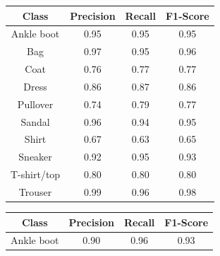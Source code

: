  \begin{table}[H]
    \centering
    \begin{minipage}{0.32\textwidth}
        \centering
        \begin{adjustbox}{max width=1\textwidth}
            \begin{tabular}{|c|c|c|c|}
                \hline
                \textbf{Class}     & \textbf{Precision} & \textbf{Recall} & \textbf{F1-Score} \\ \hline
                Ankle boot         & 0.95               & 0.95            & 0.95              \\
                Bag                & 0.97               & 0.95            & 0.96              \\
                Coat               & 0.76               & 0.77            & 0.77              \\
                Dress              & 0.86               & 0.87            & 0.86              \\
                Pullover           & 0.74               & 0.79            & 0.77              \\
                Sandal             & 0.96               & 0.94            & 0.95              \\
                Shirt              & 0.67               & 0.63            & 0.65              \\
                Sneaker            & 0.92               & 0.95            & 0.93              \\
                T-shirt/top        & 0.80               & 0.80            & 0.80              \\
                Trouser            & 0.99               & 0.96            & 0.98              \\ \hline
            \end{tabular}
        \end{adjustbox}
    \end{minipage}
    \hfill
    \begin{minipage}{0.32\textwidth}
        \centering
        \begin{adjustbox}{max width=1\textwidth}
            \begin{tabular}{|c|c|c|c|}
                \hline
                \textbf{Class}     & \textbf{Precision} & \textbf{Recall} & \textbf{F1-Score} \\ \hline
                Ankle boot         & 0.90               & 0.96            & 0.93              \\

\end{tabular}
\end{adjustbox}
\end{minipage}
\end{table}
